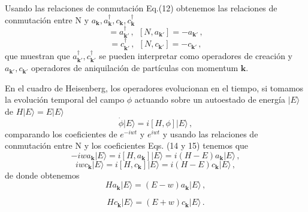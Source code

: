 \documentclass{article}
\begin{document}
Usando las relaciones de conmutación Eq.(12) obtenemos las relaciones de conmutación entre N y $a_{\mathbf{k}},a_{\mathbf{k}}^\dagger,c_{\mathbf{k}},c_{\mathbf{k}}^\dagger$ 
%
\begin{equation}
  [N,a_{{\mathbf{k}}'}^\dagger] = a_{{\mathbf{k}}'}^\dagger\,, \ \  [N,a_{{\mathbf{k}}'}] = -a_{{\mathbf{k}}'}\,, 
\end{equation}
%
\begin{equation}
  [N,c_{{\mathbf{k}}'}^\dagger] = c_{{\mathbf{k}}'}^\dagger\,, \ \  [N,c_{{\mathbf{k}}'}] = -c_{{\mathbf{k}}'}\,,
\end{equation}
%
que muestran que $a_{{\mathbf{k}}'}^\dagger, c_{{\mathbf{k}}'}^\dagger$ se pueden interpretar como operadores de creación y $a_{{\mathbf{k}}'}, c_{{\mathbf{k}}'}$ operadores de aniquilación de partículas con momentum $\mathbf{k}$.

En el cuadro de Heisenberg, los operadores evolucionan en el tiempo, si tomamos la evolución temporal del campo $\phi$ actuando sobre un autoestado de energía $|E\rangle$ de $H |E\rangle = E |E\rangle$
%
\begin{equation}
 \dot{\phi} |E\rangle = i[H,\phi] |E\rangle\,,
\end{equation}
%
comparando los coeficientes de $e^{-iwt}$ y $e^{iwt}$ y usando las relaciones de conmutación entre N y los coeficientes Eqs. (14 y 15) tenemos que
%
\begin{equation}
 -iwa_{\mathbf{k}} |E\rangle = i[H,a_{\mathbf{k}}] |E\rangle  =i(H-E)a_{\mathbf{k}} |E\rangle\,,
\end{equation}
%
\begin{equation}
 iwc_{\mathbf{k}} |E\rangle = i[H,c_{\mathbf{k}}] |E\rangle  =i(H-E)c_{\mathbf{k}} |E\rangle\,,
\end{equation}
%
de donde obtenemos
%
\begin{equation}
 Ha_{\mathbf{k}} |E\rangle =(E-w)a_{\mathbf{k}} |E\rangle\,,
\end{equation}

\begin{equation}
 Hc_{\mathbf{k}} |E\rangle =(E+w)c_{\mathbf{k}} |E\rangle\,.
\end{equation}
\end{document}
